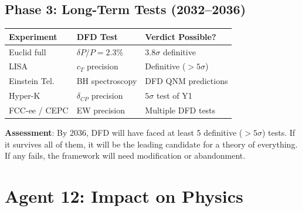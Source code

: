 \documentclass[11pt,a4paper]{article}
\begin{document}
\begin{tcolorbox}[colback=blue!5!white, colframe=dfdblue, title=\textbf{THE NEXT DECADE: 2026--2036}]
\subsection*{Phase 3: Long-Term Tests (2032--2036)}

\begin{center}
\begin{tabular}{lll}
\toprule
\textbf{Experiment} & \textbf{DFD Test} & \textbf{Verdict Possible?} \\
\midrule
Euclid full & $\delta P/P = 2.3\%$ & $3.8\sigma$ definitive \\
LISA & $c_T$ precision & Definitive ($> 5\sigma$) \\
Einstein Tel. & BH spectroscopy & DFD QNM predictions \\
Hyper-K & $\delta_{CP}$ precision & $5\sigma$ test of Y1 \\
FCC-ee / CEPC & EW precision & Multiple DFD tests \\
\bottomrule
\end{tabular}
\end{center}

\textbf{Assessment}: By 2036, DFD will have faced at least 5 definitive ($> 5\sigma$) tests. If it survives all of them, it will be the leading candidate for a theory of everything. If any fails, the framework will need modification or abandonment.
\end{tcolorbox}

\section{Agent 12: Impact on Physics}
\end{document}
